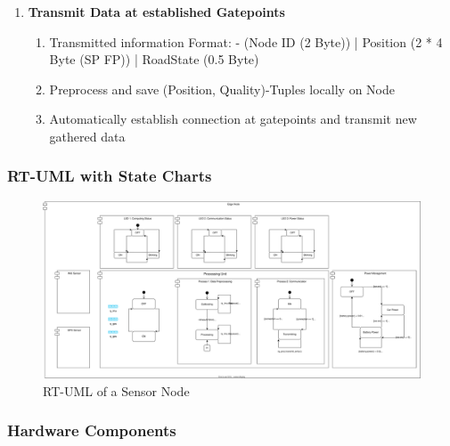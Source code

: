 \documentclass[12pt,a4paper]{article}
\begin{document}
\begin{enumerate}
\item \textbf{Transmit Data at established Gatepoints}
   \begin{enumerate}
   \item Transmitted information Format:
      - (Node ID (2 Byte)) | Position (2 * 4 Byte (SP FP)) | RoadState (0.5 Byte)
   \item Preprocess and save (Position, Quality)-Tuples locally on Node
   \item Automatically establish connection at gatepoints and transmit new gathered data
   \end{enumerate}
\end{enumerate}

\subsubsection*{RT-UML with State Charts}

\begin{figure}[h!]
\centering
\includegraphics[width=\textwidth]{../assets/diagrams/edge_node_rtuml/edge_node_rtuml.svg}
\caption{RT-UML of a Sensor Node}
\end{figure}

\subsubsection*{Hardware Components}
\end{document}
